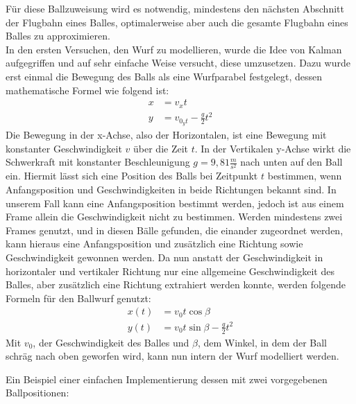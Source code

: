 \documentclass[12pt,a4paper,ngerman]{scrartcl}
\begin{document}
Für diese Ballzuweisung wird es notwendig, mindestens den nächsten Abschnitt der Flugbahn eines Balles, optimalerweise aber auch die gesamte Flugbahn eines Balles zu approximieren.\\
In den ersten Versuchen, den Wurf zu modellieren, wurde die Idee von Kalman aufgegriffen und auf sehr einfache Weise versucht, diese umzusetzen. Dazu wurde erst einmal die Bewegung des Balls als eine Wurfparabel festgelegt, dessen mathematische Formel wie folgend ist:
\begin{align}
x& = v_{x}t \label{eq:wurf1}\\
y& = v_{0_{y}t} - \frac{g}{2}t^{2} \label{eq:wurf2}
\end{align}
Die Bewegung in der x-Achse, also der Horizontalen, ist eine Bewegung mit konstanter Geschwindigkeit $v$ über die Zeit $t$. In der Vertikalen y-Achse wirkt die Schwerkraft mit konstanter Beschleunigung $g=9,81 \frac{m}{s^{2}}$ nach unten auf den Ball ein. Hiermit lässt sich eine Position des Balls bei Zeitpunkt $t$ bestimmen, wenn Anfangsposition und Geschwindigkeiten in beide Richtungen bekannt sind. In unserem Fall kann eine Anfangsposition bestimmt werden, jedoch ist aus einem Frame allein die Geschwindigkeit nicht zu bestimmen. Werden mindestens zwei Frames genutzt, und in diesen Bälle gefunden, die einander zugeordnet werden, kann hieraus eine Anfangsposition und zusätzlich eine Richtung sowie Geschwindigkeit gewonnen werden. Da nun anstatt der Geschwindigkeit in horizontaler und vertikaler Richtung nur eine allgemeine Geschwindigkeit des Balles, aber zusätzlich eine Richtung extrahiert werden konnte, werden folgende Formeln für den Ballwurf genutzt:
\begin{align}
x(t)& = v_{0}t\cos\beta \\
y(t)& = v_{0}t\sin\beta - \frac{g}{2}t^{2}
\end{align}
Mit $v_{0}$, der Geschwindigkeit des Balles und $\beta$, dem Winkel, in dem der Ball schräg nach oben geworfen wird, kann nun intern der Wurf modelliert werden.

Ein Beispiel einer einfachen Implementierung dessen mit zwei vorgegebenen Ballpositionen:
\end{document}
